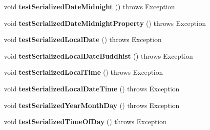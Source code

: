 \begin{DoxyCompactItemize}
\item 
\hypertarget{classorg_1_1joda_1_1time_1_1_test_serialization_afa1119cf94b4a66374ba58bb81fbfb20}{void {\bfseries test\-Serialized\-Date\-Midnight} ()  throws Exception }\label{classorg_1_1joda_1_1time_1_1_test_serialization_afa1119cf94b4a66374ba58bb81fbfb20}

\item 
\hypertarget{classorg_1_1joda_1_1time_1_1_test_serialization_a4ff8e8f838087c93ed201ed89f4f20a1}{void {\bfseries test\-Serialized\-Date\-Midnight\-Property} ()  throws Exception }\label{classorg_1_1joda_1_1time_1_1_test_serialization_a4ff8e8f838087c93ed201ed89f4f20a1}

\item 
\hypertarget{classorg_1_1joda_1_1time_1_1_test_serialization_a615c5b9bf0011189ae933079185008b6}{void {\bfseries test\-Serialized\-Local\-Date} ()  throws Exception }\label{classorg_1_1joda_1_1time_1_1_test_serialization_a615c5b9bf0011189ae933079185008b6}

\item 
\hypertarget{classorg_1_1joda_1_1time_1_1_test_serialization_ab06451eb86a87062db507b3f62f35cd6}{void {\bfseries test\-Serialized\-Local\-Date\-Buddhist} ()  throws Exception }\label{classorg_1_1joda_1_1time_1_1_test_serialization_ab06451eb86a87062db507b3f62f35cd6}

\item 
\hypertarget{classorg_1_1joda_1_1time_1_1_test_serialization_a84a7e61ec18de86b29cd41ca15fe58bc}{void {\bfseries test\-Serialized\-Local\-Time} ()  throws Exception }\label{classorg_1_1joda_1_1time_1_1_test_serialization_a84a7e61ec18de86b29cd41ca15fe58bc}

\item 
\hypertarget{classorg_1_1joda_1_1time_1_1_test_serialization_ab329878d5df5f966706956ceb4f01b9e}{void {\bfseries test\-Serialized\-Local\-Date\-Time} ()  throws Exception }\label{classorg_1_1joda_1_1time_1_1_test_serialization_ab329878d5df5f966706956ceb4f01b9e}

\item 
\hypertarget{classorg_1_1joda_1_1time_1_1_test_serialization_aa1f7e6b070b0b14f9d45a9e626aa8699}{void {\bfseries test\-Serialized\-Year\-Month\-Day} ()  throws Exception }\label{classorg_1_1joda_1_1time_1_1_test_serialization_aa1f7e6b070b0b14f9d45a9e626aa8699}

\item 
\hypertarget{classorg_1_1joda_1_1time_1_1_test_serialization_a2571d3b5964a21497f35a4b2763c7672}{void {\bfseries test\-Serialized\-Time\-Of\-Day} ()  throws Exception }\label{classorg_1_1joda_1_1time_1_1_test_serialization_a2571d3b5964a21497f35a4b2763c7672}


\end{DoxyCompactItemize}
